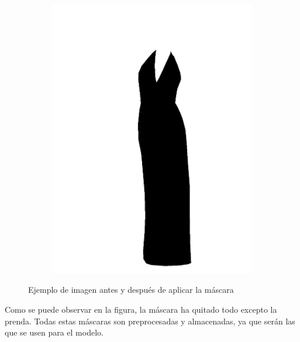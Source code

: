\documentclass[12pt]{report} %
\begin{document}
\begin{figure}[H]
\begin{subfigure}{0.45\textwidth}
			\includegraphics[width=\linewidth]{ejemplo-con-mascara.jpg}
		\end{subfigure}
		\caption{Ejemplo de imagen antes y después de aplicar la máscara}
	\end{figure}

	Como se puede observar en la figura, la máscara ha quitado todo excepto la prenda.
	Todas estas máscaras son preprocesadas y almacenadas, ya que serán las que se usen para el modelo.
\end{document}
